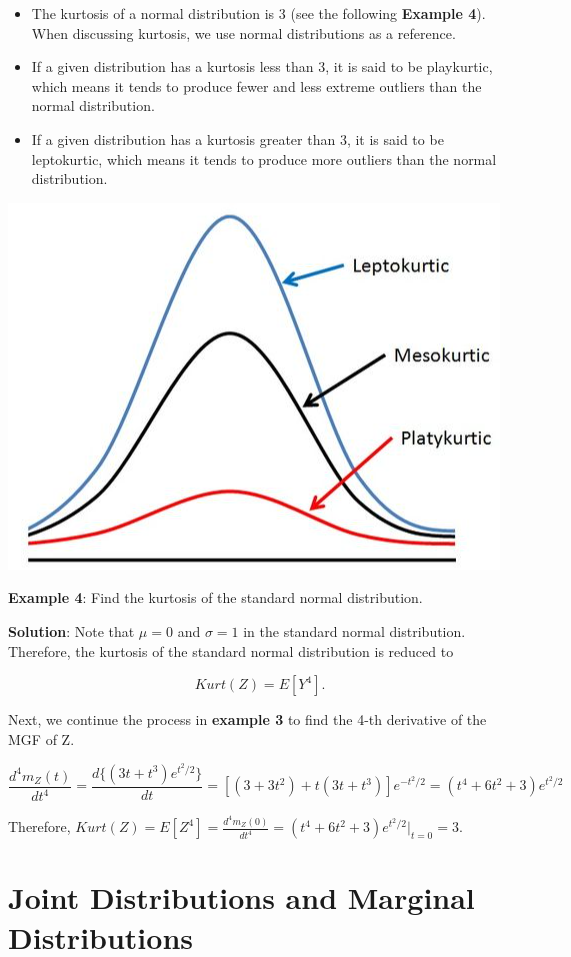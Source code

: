 \documentclass[
]{book}
\begin{document}
\begin{itemize}
\item
  The kurtosis of a normal distribution is 3 (see the following \textbf{Example 4}). When discussing kurtosis, we use normal distributions as a reference.
\item
  If a given distribution has a kurtosis less than 3, it is said to be playkurtic, which means it tends to produce fewer and less extreme outliers than the normal distribution.
\item
  If a given distribution has a kurtosis greater than 3, it is said to be leptokurtic, which means it tends to produce more outliers than the normal distribution.
\end{itemize}

\begin{center}\includegraphics[width=0.4\linewidth]{topic05/kurtosis} \end{center}

\hfill\break

\textbf{Example 4}: Find the kurtosis of the standard normal distribution.

\textbf{Solution}: Note that \(\mu = 0\) and \(\sigma = 1\) in the standard normal distribution. Therefore, the kurtosis of the standard normal distribution is reduced to

\[
Kurt(Z) = E[Y^4].
\]

Next, we continue the process in \textbf{example 3} to find the 4-th derivative of the MGF of Z.

\[
\frac{d^4 m_Z(t)}{dt^4} =\frac{d\{(3t+t^3)e^{t^2/2}\}}{dt} = [(3+3t^2)+t(3t+t^3)]e^{-t^2/2}=(t^4+6t^2+3)e^{t^2/2}
\]

Therefore, \(Kurt(Z) = E[Z^4] = \frac{d^4 m_Z(0)}{dt^4} = (t^4+6t^2+3)e^{t^2/2}|_{t=0} = 3\).

\hfill\break

\hypertarget{joint-distributions-and-marginal-distributions}{%
\chapter{Joint Distributions and Marginal Distributions}\label{joint-distributions-and-marginal-distributions}}
\end{document}

